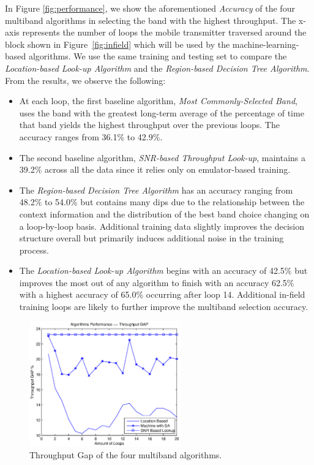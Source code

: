 In Figure \ref{fig:performance}, we show the aforementioned \emph{Accuracy}
of the four multiband algorithms in selecting the band with the highest
throughput. The x-axis represents the number of loops the
mobile transmitter traversed around the block shown in 
Figure~\ref{fig:infield} which will be used by the machine-learning-based
algorithms. We use the same training and testing set to compare 
the \emph{Location-based Look-up Algorithm} and the \emph{Region-based
Decision Tree Algorithm}. From the results, we observe the following:

\begin{itemize}
\item
At each loop, the first baseline algorithm, \emph{Most Commonly-Selected
Band}, uses the band with the greatest long-term average of the percentage
of time that band yields the highest throughput over the previous loops.
The accuracy ranges from 36.1\% to 42.9\%.
\item
The second baseline algorithm, \emph{SNR-based Throughput Look-up},
maintains a 39.2\% across all the data since it relies only on 
emulator-based training.
\item 
The \emph{Region-based Decision Tree Algorithm} has an accuracy ranging
from 48.2\% to 54.0\% but contains many dips due to the relationship
between the context information and the distribution of the best band
choice changing on a loop-by-loop basis. Additional training data 
slightly improves the decision structure overall but primarily induces
additional noise in the training process.
\item 
The \emph{Location-based Look-up Algorithm} begins with an accuracy of
42.5\% but improves the most out of any algorithm to finish with an 
accuracy 62.5\% with a highest accuracy of 65.0\% occurring after loop 14.
Additional in-field training loops are likely to further improve the multiband
selection accuracy.
\end{itemize}

\begin{figure}
\vspace{-0.1in}
\centering
\includegraphics[width=65mm]{figure/performance_gap}
\vspace{-0.1in}
\caption{Throughput Gap of the four multiband algorithms.}
\label{fig:performance_gap}
\vspace{-0.1in}
\end{figure}

